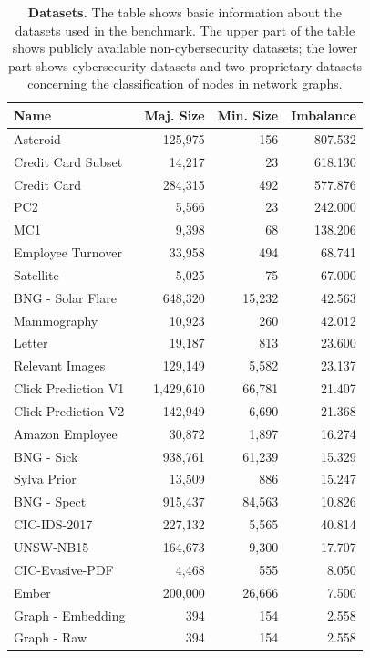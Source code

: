 \documentclass[conference]{IEEEtran}
\begin{document}
\begin{table}
    \centering
    \begin{tabular}{lrrr}
        Name & Maj. Size & Min. Size & Imbalance \\
        \midrule
        Asteroid & 125,975 & 156 & 807.532 \\
        Credit Card Subset~\cite{credit-card} & 14,217 & 23 & 618.130 \\
        Credit Card~\cite{credit-card} & 284,315 & 492 & 577.876 \\
        PC2~\cite{pc2+mc1} & 5,566 & 23 & 242.000 \\
        MC1~\cite{pc2+mc1} & 9,398 & 68 & 138.206 \\
        Employee Turnover & 33,958 & 494 & 68.741 \\
        Satellite~\cite{satellite} & 5,025 & 75 & 67.000 \\
        BNG - Solar Flare & 648,320 & 15,232 & 42.563 \\
        Mammography & 10,923 & 260 & 42.012 \\
        Letter~\cite{lttr-dataset} & 19,187 & 813 & 23.600 \\
        Relevant Images & 129,149 & 5,582 & 23.137 \\
        Click Prediction V1 & 1,429,610 & 66,781 & 21.407 \\
        Click Prediction V2 & 142,949 & 6,690 & 21.368 \\
        Amazon Employee & 30,872 & 1,897 & 16.274 \\
        BNG - Sick & 938,761 & 61,239 & 15.329 \\
        Sylva Prior & 13,509 & 886 & 15.247 \\
        BNG - Spect & 915,437 & 84,563 & 10.826 \\
        \midrule
        CIC-IDS-2017~\cite{ids} & 227,132 & 5,565 & 40.814 \\
        UNSW-NB15~\cite{unsw} & 164,673 & 9,300 & 17.707 \\
        CIC-Evasive-PDF~\cite{pdf} & 4,468 & 555 & 8.050 \\
        Ember~\cite{ember} & 200,000 & 26,666 & 7.500 \\
        Graph - Embedding~\cite{dvorak2022} & 394 & 154 & 2.558 \\
        Graph - Raw~\cite{dvorak2022} & 394 & 154 & 2.558 \\
    \end{tabular}

    \vspace{4mm}

    \caption{
        \textbf{Datasets.} The table shows basic information about the datasets used in the
        benchmark. The upper part of the table shows publicly available non-cybersecurity datasets;
        the lower part shows cybersecurity datasets and two proprietary datasets concerning the
        classification of nodes in network graphs.
    }
    \label{table:datasets}
\end{table}
\end{document}

